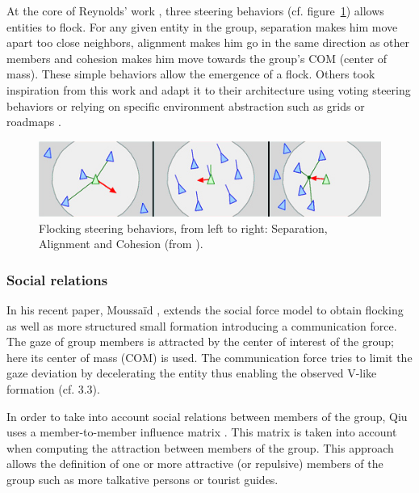 \documentclass{article}
\begin{document}
At the core of Reynolds’ work \cite{Reynolds:1987vm,Reynolds:1999vr}, three steering behaviors (cf. figure~\ref{fig:flocking_steering_behaviors}) allows entities to flock. For any given entity in the group, separation makes him move apart too close neighbors, alignment makes him go in the same direction as other members and cohesion makes him move towards the group’s COM (center of mass). These simple behaviors allow the emergence of a flock. Others took inspiration from this work and adapt it to their architecture using voting steering behaviors \cite{Hostetler:2002wg} or relying on specific environment abstraction such as grids \cite{Loscos:2003wh} or roadmaps \cite{Bayazit:2003up,Kamphuis:2004ct}.

\begin{figure}[htb]
\centering
\includegraphics[width=\textwidth]{FlockingSteeringBehaviors.jpg}
\caption{Flocking steering behaviors, from left to right: Separation, Alignment and Cohesion (from \cite{Reynolds:1999vr}).}
\label{fig:flocking_steering_behaviors}
\end{figure}

\subsubsection{Social relations}

In his recent paper, Moussaïd \cite{Moussaid:2010ib}, extends the social force model \cite{Helbing:2000vh} to obtain flocking as well as more structured small formation introducing a communication force. The gaze of group members is attracted by the center of interest of the group; here its center of mass (COM) is used. The communication force tries to limit the gaze deviation by decelerating the entity thus enabling the observed V-like formation (cf. 3.3).

In order to take into account social relations between members of the group, Qiu uses a member-to-member influence matrix \cite{Qiu:2010ks}. This matrix is taken into account when computing the attraction between members of the group. This approach allows the definition of one or more attractive (or repulsive) members of the group such as more talkative persons or tourist guides.
\end{document}
